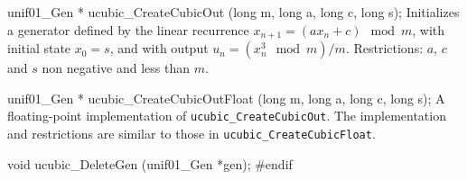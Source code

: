 unif01_Gen * ucubic_CreateCubicOut (long m, long a, long c, long s);
\endcode
  \tab Initializes a generator defined by the linear recurrence
   $x_{n+1} = (a x_n + c) \mod m$, with initial state $x_0 = s$,
   and with output $u_n = (x_n^3 \mod m) / m$.
   Restrictions: $a$, $c$ and $s$ non negative and less than  $m$.
 \endtab
\code


unif01_Gen * ucubic_CreateCubicOutFloat (long m, long a, long c, long s);
\endcode
  \tab A floating-point implementation of {\tt ucubic\_CreateCubicOut}.
  The implementation and restrictions are similar to those in
  {\tt ucubic\_CreateCubicFloat}.
 \endtab



\code

void ucubic_DeleteGen (unif01_Gen *gen);
\endcode
 \tab \DelGen
 \endtab
\code
\hide
#endif
\endhide
\endcode
